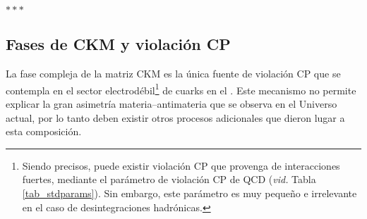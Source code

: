
\bigskip

\begin{center}
	$***$
\end{center}

\medskip


\begin{subappendices}





\section{Fases de CKM y violación CP}  %
\label{ap_cpvio}

La fase compleja de la matriz CKM es la única fuente de violación CP que se contempla en el sector electrodébil\footnote{Siendo precisos, puede existir violación CP que provenga de interacciones fuertes, mediante el parámetro de violación CP de QCD (\emph{vid.} Tabla \ref{tab_stdparams}). Sin embargo, este parámetro es muy pequeño e irrelevante en el caso de desintegraciones hadrónicas.} de cuarks en el \stdmod. Este mecanismo no permite explicar la gran asimetría materia--antimateria que se observa en el Universo actual, por lo tanto deben existir otros procesos adicionales que dieron lugar a esta composición.


\end{subappendices}
